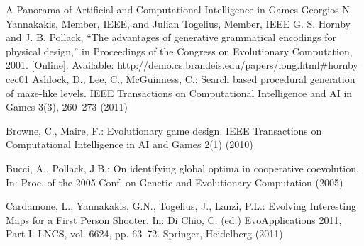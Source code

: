 \begin{thebibliography}{X}
A Panorama of Artificial and Computational Intelligence in Games Georgios N. Yannakakis, Member, IEEE, and Julian Togelius, Member, IEEE
G. S. Hornby and J. B. Pollack, “The advantages of generative grammatical encodings for physical design,” in Proceedings of the Congress on Evolutionary Computation, 2001. [Online]. Available: http://demo.cs.brandeis.edu/papers/long.html#hornby cec01
Ashlock, D., Lee, C., McGuinness, C.: Search based procedural generation of maze-like
levels. IEEE Transactions on Computational Intelligence and AI in Games 3(3), 260–273
(2011)

Browne, C., Maire, F.: Evolutionary game design. IEEE Transactions on Computational Intelligence
in AI and Games 2(1) (2010)

 Bucci, A., Pollack, J.B.: On identifying global optima in cooperative coevolution. In: Proc.
of the 2005 Conf. on Genetic and Evolutionary Computation (2005)

 Cardamone, L., Yannakakis, G.N., Togelius, J., Lanzi, P.L.: Evolving Interesting Maps for a
First Person Shooter. In: Di Chio, C. (ed.) EvoApplications 2011, Part I. LNCS, vol. 6624,
pp. 63–72. Springer, Heidelberg (2011)

\end{thebibliography}